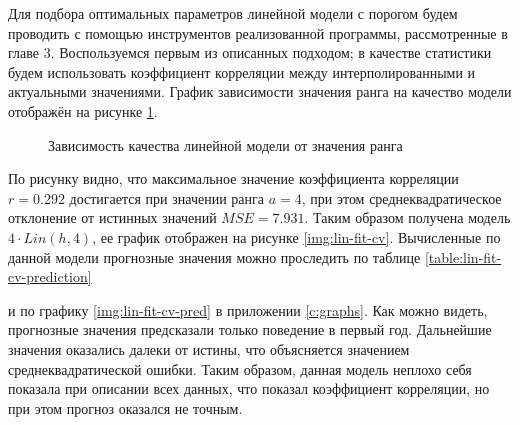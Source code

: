 Для подбора оптимальных параметров линейной модели с порогом будем проводить с помощью инструментов реализованной программы, рассмотренные в главе 3. Воспользуемся первым из описанных подходом; в качестве статистики будем использовать коэффициент корреляции между интерполированными и актуальными значениями. График зависимости значения ранга на качество модели отображён на рисунке \ref{img:lin-range-cv}.
\begin{figure}[ht]
\caption{Зависимость качества линейной модели от значения ранга}
\label{img:lin-range-cv}
\end{figure}
По рисунку видно, что максимальное значение коэффициента корреляции $ r = 0.292 $ достигается при значении ранга $ a = 4 $, при этом среднеквадратическое отклонение от истинных значений $ MSE = 7.931 $. Таким образом получена модель $ 4 \cdot Lin(h, 4) $, ее график отображен на рисунке \ref{img:lin-fit-cv}. Вычисленные по данной модели прогнозные значения можно проследить по таблице \ref{table:lin-fit-cv-prediction}

и по графику \ref{img:lin-fit-cv-pred} в приложении \ref{c:graphs}. Как можно видеть, прогнозные значения предсказали только поведение в первый год. Дальнейшие значения оказались далеки от истины, что объясняется значением среднеквадратической ошибки. Таким образом, данная модель неплохо себя показала при описании всех данных, что показал коэффициент корреляции, но при этом прогноз оказался не точным.

